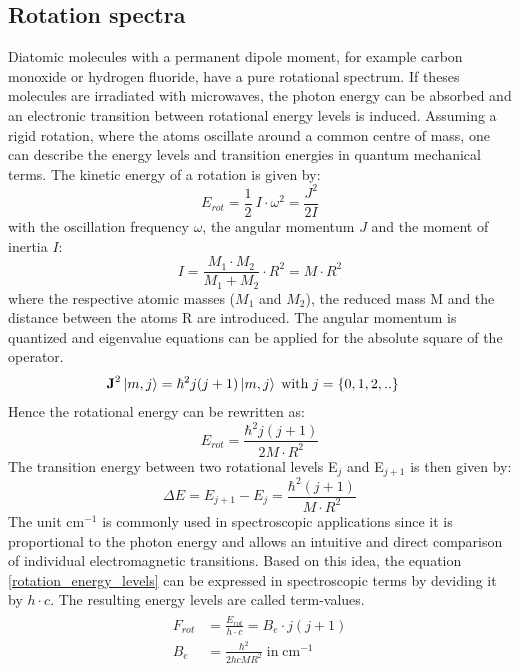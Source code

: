 \subsection{Rotation spectra}
Diatomic molecules with a permanent dipole moment, for example carbon monoxide or hydrogen fluoride, have a pure rotational spectrum. If theses molecules are irradiated with microwaves, the photon energy can be absorbed and an electronic transition between rotational energy levels is induced. Assuming a rigid rotation, where the atoms oscillate around a common centre of mass, one can describe the energy levels and transition energies in quantum mechanical terms. The kinetic energy of a rotation is given by:
\begin{equation}
E_{rot} =\frac{1}{2}\: I \cdot \omega^2 = \frac{J^2}{2 I}
\end{equation}
with the oscillation frequency $\omega$, the angular momentum $J$ and the moment of inertia $I$:
\begin{equation}
I =\frac{M_1 \cdot M_2}{M_1 +M_2} \cdot R^2  = M\cdot R^2
\end{equation}
where the respective atomic masses ($M_1$ and $M_2$), the reduced mass M and the distance between the atoms R are introduced. 
The angular momentum is quantized and eigenvalue equations can be applied for the absolute square of the operator.
\begin{align}
 \textbf{J}^2\ket{m,j} &= \hbar^2j(j+1)\ket{m,j} \; \text{with} \; j=\{0,1,2,..\}
 \end{align}
 Hence the rotational energy can be rewritten as:
 \begin{equation}
 E_{rot} = \frac{\hbar^2j(j+1)}{2M \cdot R^2}
 \label{rotation_energy_levels}
 \end{equation}
 The transition energy between two rotational levels E$_j$ and E$_{j+1}$ is then given by:
 \begin{equation}
\Delta E=E_{j+1}-E_j = \frac{\hbar^2(j+1)}{M \cdot R^2}
\label{rotation_transition_energy}
 \end{equation}
 The unit cm$^{-1}$ is commonly used in spectroscopic applications since it is proportional to the photon energy and allows an intuitive and direct comparison of individual electromagnetic transitions. Based on this idea, the equation \ref{rotation_energy_levels} can be expressed in spectroscopic terms by deviding it by $h\cdot c$. The resulting energy levels are called term-values.
 \begin{align}
 \begin{split}
 F_{rot}&=\frac{E_{rot}}{h\cdot c} = B_e \cdot j(j+1)\\
  B_e &=\frac{\hbar^2}{2hcMR^2} \; \text{in}\; \text{cm}^{-1}
 \label{rotation_energy_levels_cm-1}
 \end{split}
 \end{align}
